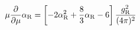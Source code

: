 \begin{equation}
\mu\frac{\partial}{\partial\mu} \alpha_{\rm R}
 =
  \left[-2\alpha_{\rm R}^2+\frac83\alpha_{\rm R}-6
  \right] \frac{g_{\rm R}^2}{(4\pi)^2} 
\label{MAalpha}
\end{equation}

